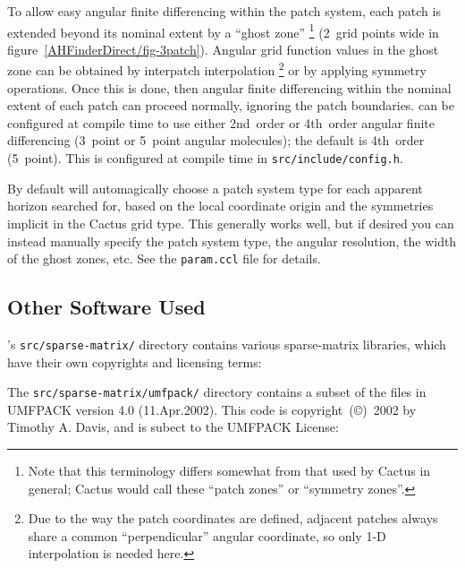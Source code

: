 To allow easy angular finite differencing within the patch system,
each patch is extended beyond its nominal extent by a ``ghost zone''%
\footnote{%
	 Note that this terminology differs somewhat
	 from that used by Cactus in general; Cactus
	 would call these ``patch zones'' or ``symmetry
	 zones''.
	 }%
{} (2~grid points wide in figure~\ref{AHFinderDirect/fig-3patch}).
Angular grid function values in the ghost zone can be obtained by
interpatch interpolation%
\footnote{%
	 Due to the way the patch coordinates are defined,
	 adjacent patches always share a common ``perpendicular''
	 angular coordinate, so only 1-D interpolation
	 is needed here.
	 }%
{} or by applying symmetry operations.  Once this is done, then angular
finite differencing within the nominal extent of each patch can proceed
normally, ignoring the patch boundaries.   can
be configured at compile time to use either 2nd~order or 4th~order
angular finite differencing (3~point or 5~point angular molecules);
the default is 4th~order (5~point).  This is configured at compile time
in \verb|src/include/config.h|.

By default  will automagically choose a patch
system type for each apparent horizon searched for, based on the local
coordinate origin and the symmetries implicit in the Cactus grid type.
This generally works well, but if desired you can instead manually
specify the patch system type, the angular resolution, the width of
the ghost zones, etc.  See the \verb|param.ccl| file for details.


\subsection{Other Software Used}

's \verb|src/sparse-matrix/| directory contains
various sparse-matrix libraries, which have their own copyrights and
licensing terms:

The \verb|src/sparse-matrix/umfpack/| directory contains a subset of the
files in UMFPACK version 4.0 (11.Apr.2002).  This code is
copyright~(\copyright)~2002 by Timothy A. Davis, and is subect to the
UMFPACK License:

